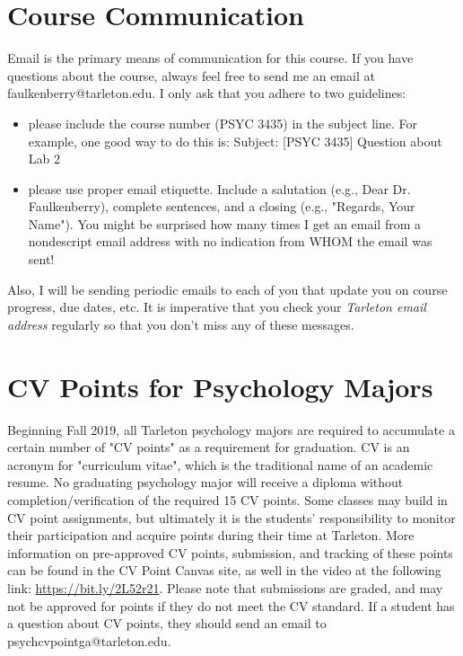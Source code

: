\documentclass[10pt]{article}
\begin{document}
\section*{Course Communication}
\label{sec:org6310c92}

Email is the primary means of communication for this course.  If you have questions about the course, always feel free to send me an email at faulkenberry@tarleton.edu.  I only ask that you adhere to two guidelines:
\begin{itemize}
\item please include the course number (PSYC 3435) in the subject line.  For example, one good way to do this is:  Subject: [PSYC 3435] Question about Lab 2
\item please use proper email etiquette.  Include a salutation (e.g., Dear Dr. Faulkenberry), complete sentences, and a closing (e.g., "Regards, Your Name").  You might be surprised how many times I get an email from a nondescript email address with no indication from WHOM the email was sent!
\end{itemize}

Also, I will be sending periodic emails to each of you that update you on course progress, due dates, etc.  It is imperative that you check your \emph{Tarleton email address} regularly so that you don't miss any of these messages.

\section*{CV Points for Psychology Majors}
\label{sec:orgc25acff}
Beginning Fall 2019, all Tarleton psychology majors are required to accumulate a certain number of "CV points" as a requirement for graduation. CV is an acronym for "curriculum vitae", which is the traditional name of an academic resume.  No graduating psychology major will receive a diploma without completion/verification of the required 15 CV points. Some classes may build in CV point assignments, but ultimately it is the students’ responsibility to monitor their participation and acquire points during their time at Tarleton.  More information on pre-approved CV points, submission, and tracking of these points can be found in the CV Point Canvas site, as well in the video at the following link: \url{https://bit.ly/2L52r21}. Please note that submissions are graded, and may not be approved for points if they do not meet the CV standard.  If a student has a question about CV points, they should send an email to psychcvpointga@tarleton.edu.
\end{document}
